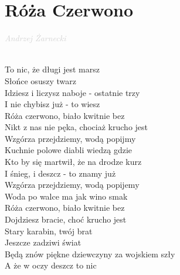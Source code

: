 \documentclass[a5paper, 10pt]{book}
\begin{document}
\section{Róża Czerwono}\textcolor{lightgray}{\textit{Andrzej Żarnecki}}\\~\\
\begin{minipage}[t]{0.7\textwidth}
  To nic, że długi jest marsz\\
  Słońce osuszy twarz\\
  Idziesz i liczysz naboje - ostatnie trzy\\
  I nie chybisz już - to wiesz\\

  \hspace*{5mm}Róża czerwono, biało kwitnie bez\\
  \hspace*{5mm}Nikt z nas nie pęka, chociaż krucho jest\\
  \hspace*{5mm}Wzgórza przejdziemy, wodą popijmy\\
  \hspace*{5mm}Kuchnie polowe diabli wiedzą gdzie\\
  \hspace*{5mm}Kto by się martwił, że na drodze kurz\\
  \hspace*{5mm}I śnieg, i deszcz - to znamy już\\
  \hspace*{5mm}Wzgórza przejdziemy, wodą popijemy\\
  \hspace*{5mm}Woda po walce ma jak wino smak\\
  \hspace*{5mm}Róża czerwono, biało kwitnie bez\\
  \hspace*{5mm}Dojdziesz bracie, choć krucho jest\\

  Stary karabin, twój brat\\
  Jeszcze zadziwi świat\\
  Będą znów piękne dziewczyny za wojskiem szły\\
  A że w oczy deszcz to nic\\


\end{minipage}
\end{document}
